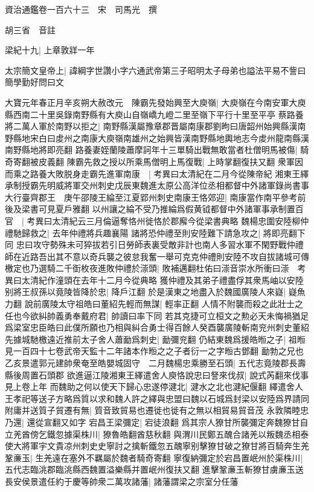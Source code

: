 資治通鑑卷一百六十三　宋　司馬光　撰

胡三省　音註

梁紀十九|{
	上章敦牂一年}


太宗簡文皇帝上|{
	諱綱字世讚小字六通武帝第三子昭明太子母弟也謚法平易不訾曰簡學勤好問曰文}


大寶元年春正月辛亥朔大赦改元　陳霸先發始興至大庾嶺|{
	大庾嶺在今南安軍大庾縣西南二十里吳錄南野縣有大庾山自嶺嶠九嶝二里至嶺下平行十里至平亭}
蔡路養將二萬人軍於南野以拒之|{
	南野縣漢屬豫章郡晋屬南康郡劉昫曰唐韶州始興縣漢南野縣地宋白曰䖍州之南康大庾嶺南雄州之始興皆漢南野縣地輿地志今䖍州龍南縣漢南野縣地將即亮翻}
路養妻姪蘭陵蕭摩訶年十三單騎出戰無敢當者杜僧明馬被傷|{
	騎奇寄翻被皮義翻}
陳霸先救之授以所乘馬僧明上馬復戰|{
	上時掌翻復扶又翻}
衆軍因而乘之路養大敗脱身走霸先進軍南康　|{
	考異曰太清紀在二月今從陳帝紀}
湘東王繹承制授霸先明威將軍交州刺史戊辰東魏進太原公高洋位丞相都督中外諸軍錄尚書事大行臺齊郡王　庚午邵陵王綸至江夏郢州刺史南康王恪郊迎|{
	南康當作南平參考前後及梁書可見夏戶雅翻}
以州讓之綸不受乃推綸爲假黄钺都督中外諸軍事承制置百官　|{
	考異曰太清紀云三月倫逼奪恪州徙恪於郡廨今從梁書典略}
魏楊忠圍安陸柳仲禮馳歸救之|{
	去年仲禮將兵趣襄陽}
諸將恐仲禮至則安陸難下請急攻之|{
	將即亮翻下同}
忠曰攻守勢殊未可猝拔若引日勞師表裏受敵非計也南人多習水軍不閑野戰仲禮師在近路吾出其不意以奇兵襲之彼怠我奮一舉可克克仲禮則安陸不攻自拔諸城可傳檄定也乃選騎二千衘枚夜進敗仲禮於漴頭|{
	敗補邁翻杜佑曰漴音崇水所衝曰漴　考異曰太清紀作潼頭在去年十二月今從典略}
獲仲禮及其弟子禮盡俘其衆馬岫以安陸别將王叔孫以竟陵皆降於忠|{
	降戶江翻}
於是漢東之地盡入於魏國廣陵人來嶷|{
	嶷魚力翻}
說前廣陵太守祖皓曰董紹先輕而無謀|{
	輕率正翻}
人情不附襲而殺之此壯士之任也今欲糾帥義勇奉戴府君|{
	帥讀曰率下同}
若其克捷可立桓文之勲必天未悔禍猶足爲梁室忠臣皓曰此僕所願也乃相與糾合勇士得百餘人癸酉襲廣陵斬南兖州刺史董紹先據城馳檄遠近推前太子舍人蕭勔爲刺史|{
	勔彌兖翻}
仍結東魏爲援皓暅之子|{
	祖暅見一百四十七卷武帝天監十二年諸本作暅之之子者衍一之字暅古鄧翻}
勔勃之兄也乙亥景遣郭元建帥衆奄至皓嬰城固守　二月魏楊忠乘勝至石頭|{
	五代志竟陵郡長壽縣後周置石頭郡}
欲進逼江陵湘東王繹遣舍人庾恪說忠曰詧來伐叔|{
	說式芮翻來伐事見上卷上年}
而魏助之何以使天下歸心忠遂停湕北|{
	湕水之北也湕紀偃翻}
繹遣舍人王孝祀等送子方略爲質以求和魏人許之繹與忠盟曰魏以石城爲封梁以安陸爲界請同附庸并送質子貿遷有無|{
	質音致貿易也遷徙也徙有之無以相貿易貿音茂}
永敦隣睦忠乃還|{
	還從宣翻又如字}
宕昌王梁彌定|{
	宕徒浪翻}
爲其宗人獠甘所襲彌定奔魏獠甘自立羌酋傍乞鐵忽據渠株川|{
	獠魯皓翻酋慈秋翻}
與渭川民鄭五醜合諸羌以叛魏丞相泰使大將軍宇文貴凉州刺史史寧討之擒斬鐵忽五醜寧别擊獠甘破之獠甘將百騎奔生羌鞏亷玉|{
	生羌遠在塞外不羈屬於魏者騎奇寄翻}
寧復納彌定於宕昌置岷州於渠株川|{
	五代志臨洮郡臨洮縣西魏置溢樂縣并置岷州復扶又翻}
進擊鞏亷玉斬獠甘虜亷玉送長安侯景遣任約于慶等帥衆二萬攻諸藩|{
	諸藩謂梁之宗室分任藩}


